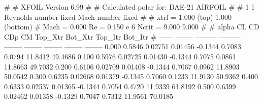 #  
#       XFOIL         Version 6.99
#  
# Calculated polar for: DAE-21 AIRFOIL                                  
#  
# 1 1 Reynolds number fixed          Mach number fixed         
#  
# xtrf =   1.000 (top)        1.000 (bottom)  
# Mach =   0.000     Re =     0.150 e 6     Ncrit =   9.000  9.000
#  
#   alpha    CL        CD       CDp       CM     Top_Xtr  Bot_Xtr  Top_Itr  Bot_Itr
#  ------ -------- --------- --------- -------- -------- -------- -------- --------
   0.000   0.5846   0.02751   0.01456  -0.1344   0.7083   0.0794  11.8412  49.4686
   0.100   0.5976   0.02725   0.01430  -0.1344   0.7075   0.0861  11.8663  49.7032
   0.200   0.6106   0.02709   0.01408  -0.1344   0.7067   0.0962  11.8903  50.0542
   0.300   0.6235   0.02668   0.01379  -0.1345   0.7060   0.1233  11.9130  50.9362
   0.400   0.6333   0.02537   0.01365  -0.1344   0.7054   0.4720  11.9339  61.8192
   0.500   0.6399   0.02462   0.01358  -0.1329   0.7047   0.7312  11.9561  70.0185
